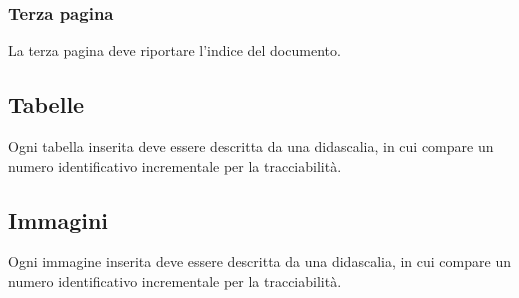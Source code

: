 \subsubsection{Terza pagina}
\label{5.2.5}
La terza pagina deve riportare l'indice del documento.

\subsection{Tabelle}
Ogni tabella inserita deve essere descritta da una didascalia, in cui compare un numero identificativo incrementale per la tracciabilità.
\subsection{Immagini}
Ogni immagine inserita deve essere descritta da una didascalia, in cui compare un numero identificativo incrementale per la tracciabilità.

